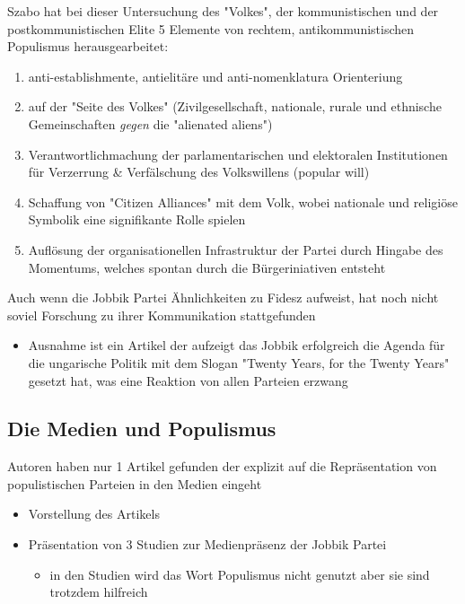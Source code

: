 \documentclass[11pt]{article}
\begin{document}
Szabo hat bei dieser Untersuchung des "Volkes", der kommunistischen und der postkommunistischen Elite 5 Elemente von rechtem, antikommunistischen Populismus herausgearbeitet:
\begin{enumerate}
\item anti-establishmente, antielitäre und anti-nomenklatura Orienteriung
\item auf der "Seite des Volkes" (Zivilgesellschaft, nationale, rurale und ethnische Gemeinschaften \emph{gegen} die "alienated aliens")
\item Verantwortlichmachung der parlamentarischen und elektoralen Institutionen für Verzerrung \& Verfälschung des Volkswillens (popular will)
\item Schaffung von "Citizen Alliances" mit dem Volk, wobei nationale und religiöse Symbolik eine signifikante Rolle spielen
\item Auflösung der organisationellen Infrastruktur der Partei durch Hingabe des Momentums, welches spontan durch die Bürgeriniativen entsteht
\end{enumerate}


Auch wenn die Jobbik Partei Ähnlichkeiten zu Fidesz aufweist, hat noch nicht soviel Forschung zu ihrer Kommunikation stattgefunden
\begin{itemize}
\item Ausnahme ist ein Artikel der aufzeigt das Jobbik erfolgreich die Agenda für die ungarische Politik mit dem Slogan "Twenty Years, for the Twenty Years" gesetzt hat, was eine Reaktion von allen Parteien erzwang
\end{itemize}

\subsection{Die Medien und Populismus}
\label{sec:orgb67d6db}
Autoren haben nur 1 Artikel gefunden der explizit auf die Repräsentation von populistischen Parteien in den Medien eingeht
\begin{itemize}
\item Vorstellung des Artikels
\item Präsentation von 3 Studien zur Medienpräsenz der Jobbik Partei
\begin{itemize}
\item in den Studien wird das Wort Populismus nicht genutzt aber sie sind trotzdem hilfreich
\end{itemize}
\end{itemize}
\end{document}
